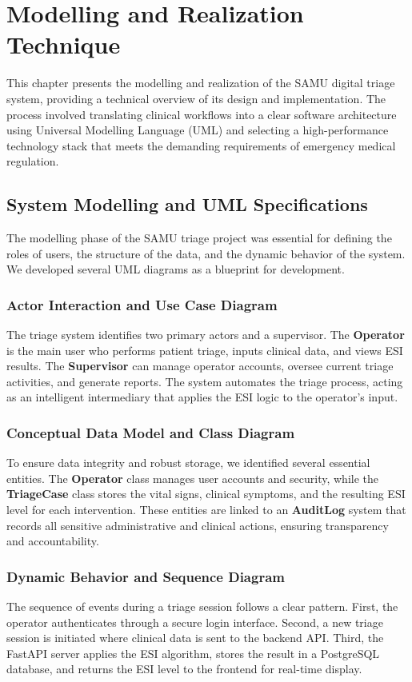 \chapter{Modelling and Realization Technique}
\thispagestyle{fancy}
\justifying

This chapter presents the modelling and realization of the SAMU digital triage system, providing a technical overview of its design and implementation. The process involved translating clinical workflows into a clear software architecture using Universal Modelling Language (UML) and selecting a high-performance technology stack that meets the demanding requirements of emergency medical regulation.

\section{System Modelling and UML Specifications}
The modelling phase of the SAMU triage project was essential for defining the roles of users, the structure of the data, and the dynamic behavior of the system. We developed several UML diagrams as a blueprint for development.

\subsection{Actor Interaction and Use Case Diagram}
The triage system identifies two primary actors and a supervisor. The \textbf{Operator} is the main user who performs patient triage, inputs clinical data, and views ESI results. The \textbf{Supervisor} can manage operator accounts, oversee current triage activities, and generate reports. The system automates the triage process, acting as an intelligent intermediary that applies the ESI logic to the operator's input.

\subsection{Conceptual Data Model and Class Diagram}
To ensure data integrity and robust storage, we identified several essential entities. The \textbf{Operator} class manages user accounts and security, while the \textbf{TriageCase} class stores the vital signs, clinical symptoms, and the resulting ESI level for each intervention. These entities are linked to an \textbf{AuditLog} system that records all sensitive administrative and clinical actions, ensuring transparency and accountability.

\subsection{Dynamic Behavior and Sequence Diagram}
The sequence of events during a triage session follows a clear pattern. First, the operator authenticates through a secure login interface. Second, a new triage session is initiated where clinical data is sent to the backend API. Third, the FastAPI server applies the ESI algorithm, stores the result in a PostgreSQL database, and returns the ESI level to the frontend for real-time display.

